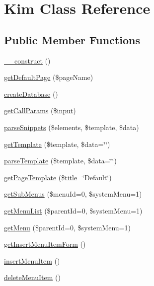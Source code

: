 \hypertarget{classKim}{}\section{Kim Class Reference}
\label{classKim}
\subsection*{Public Member Functions}
\begin{DoxyCompactItemize}
\item 
\hyperlink{classKim_a23fe2ba2b5a76fe09200e2f0fbded794}{\+\_\+\+\_\+construct} ()
\item 
\hyperlink{classKim_a8a754c69958e71d159e6808f83f12cfe}{get\+Default\+Page} (\$page\+Name)
\item 
\hyperlink{classKim_ae9db930151f99235866c68fd96208cd8}{create\+Database} ()
\item 
\hyperlink{classKim_adbe9f842961805e68a08df04c4c58dfd}{get\+Call\+Params} (\$\hyperlink{Shape_8php_a6210da308e7ce036a6362dca3018d6db}{input})
\item 
\hyperlink{classKim_a960a80702fe7dd134adbfeea34ccfcfa}{parse\+Snippets} (\$elements, \$template, \$data)
\item 
\hyperlink{classKim_ae484524c4622734ede53894ae89a669a}{get\+Template} (\$template, \$data=\char`\"{}\char`\"{})
\item 
\hyperlink{classKim_a635cc5c4509bd3ac1c578ccfe62c623b}{parse\+Template} (\$template, \$data=\char`\"{}\char`\"{})
\item 
\hyperlink{classKim_a3cb9fd00227b180b8118257b85acf6ff}{get\+Page\+Template} (\$\hyperlink{Shape_8php_ad264ad0cabbe965bf7f7c8a5ed6abebb}{title}=\char`\"{}Default\char`\"{})
\item 
\hyperlink{classKim_a76d369e52b95a9cabdb45c793d3eee45}{get\+Sub\+Menus} (\$menu\+Id=0, \$system\+Menu=1)
\item 
\hyperlink{classKim_ad7f2c106626bd9e83f1a4f76303a6e45}{get\+Menu\+List} (\$parent\+Id=0, \$system\+Menu=1)
\item 
\hyperlink{classKim_ac4c6f020c4abed55574cc4515b8c1b01}{get\+Menu} (\$parent\+Id=0, \$system\+Menu=1)
\item 
\hyperlink{classKim_a7391f7a7d90adef0a048f2679aaa27fd}{get\+Insert\+Menu\+Item\+Form} ()
\item 
\hyperlink{classKim_a03aa4a733e4539d175df84011ad1cb9a}{insert\+Menu\+Item} ()
\item 
\hyperlink{classKim_ab0a2f80e33b3d6ed654fbf6b8cf55291}{delete\+Menu\+Item} ()

\end{DoxyCompactItemize}
